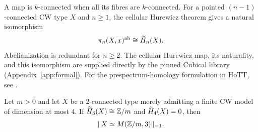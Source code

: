 A map is $k$-connected when all its fibres are $k$-connected. For a pointed $(n-1)$-connected CW type $X$ and $n\geq1$, the cellular Hurewicz theorem gives a natural isomorphism
\[
\pi_n(X,x)^{\mathrm{ab}}\cong\widetilde H_n(X).
\]
Abelianization is redundant for $n\geq2$. The cellular Hurewicz map, its naturality, and this isomorphism are supplied directly by the pinned Cubical library (Appendix~\ref{app:formal}). For the prespectrum-homology formulation in HoTT, see \cite[Theorem~3.12]{hurewiczhott}.

\begin{theorem}\label{thm:moore-recognition}
Let $m>0$ and let $X$ be a $2$-connected type merely admitting a finite CW model of dimension at most $4$. If $\widetilde H_3(X)\cong\mathbb Z/m$ and $\widetilde H_4(X)=0$, then
\[
\lVert X\simeq M(\mathbb Z/m,3)\rVert_{-1}.
\]
\end{theorem}
